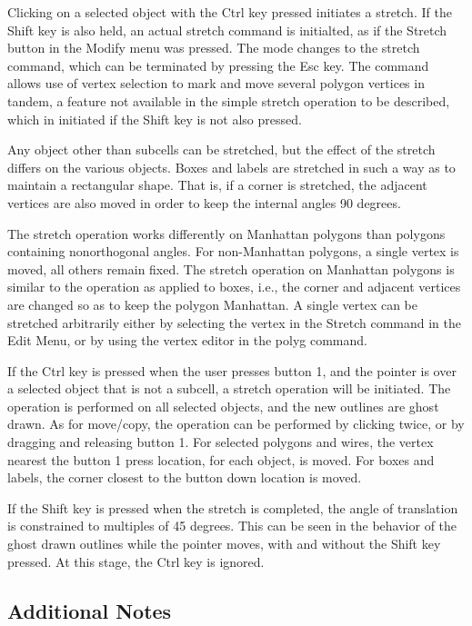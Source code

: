 Clicking on a selected object with the {\kb Ctrl} key pressed
initiates a stretch.  If the {\kb Shift} key is also held, an actual
stretch command is initialted, as if the {\cb Stretch} button in the
{\cb Modify} menu was pressed.  The mode changes to the stretch
command, which can be terminated by pressing the {\kb Esc} key.  The
command allows use of vertex selection to mark and move several
polygon vertices in tandem, a feature not available in the simple
stretch operation to be described, which in initiated if the {\kb
Shift} key is not also pressed.

Any object other than subcells can be stretched, but the effect of the
stretch differs on the various objects.  Boxes and labels are
stretched in such a way as to maintain a rectangular shape.  That is,
if a corner is stretched, the adjacent vertices are also moved in
order to keep the internal angles 90 degrees.

The stretch operation works differently on Manhattan polygons than
polygons containing nonorthogonal angles.  For non-Manhattan polygons,
a single vertex is moved, all others remain fixed.  The stretch
operation on Manhattan polygons is similar to the operation as applied
to boxes, i.e., the corner and adjacent vertices are changed so as to
keep the polygon Manhattan.  A single vertex can be stretched
arbitrarily either by selecting the vertex in the {\cb Stretch}
command in the {\cb Edit Menu}, or by using the vertex editor in the
{\cb polyg} command.

If the {\kb Ctrl} key is pressed when the user presses button 1, and
the pointer is over a selected object that is not a subcell, a stretch
operation will be initiated.  The operation is performed on all
selected objects, and the new outlines are ghost drawn.  As for
move/copy, the operation can be performed by clicking twice, or by
dragging and releasing button 1.  For selected polygons and wires, the
vertex nearest the button 1 press location, for each object, is moved. 
For boxes and labels, the corner closest to the button down location
is moved.

If the {\kb Shift} key is pressed when the stretch is completed, the
angle of translation is constrained to multiples of 45 degrees.  This
can be seen in the behavior of the ghost drawn outlines while the
pointer moves, with and without the {\kb Shift} key pressed.  At this
stage, the {\kb Ctrl} key is ignored.

\subsection{Additional Notes}

